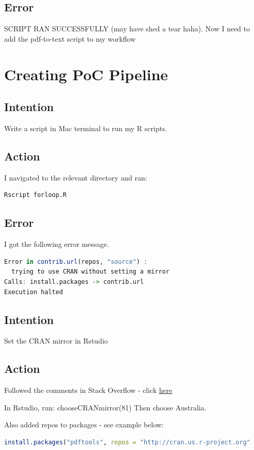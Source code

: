 \documentclass{article}
\begin{document}
\subsection{Error}
SCRIPT RAN SUCCESSFULLY (may have shed a tear haha).
Now I need to add the pdf-to-text script to my workflow

\section{Creating PoC Pipeline}
\subsection{Intention}
Write a script in Mac terminal to run my R scripts. 

\subsection{Action}
I navigated to the relevant directory and ran:
\begin{lstlisting}[language=R]
Rscript forloop.R 
\end{lstlisting}

\subsection{Error}
I got the following error message. 

\begin{lstlisting}[language=R]
Error in contrib.url(repos, "source") : 
  trying to use CRAN without setting a mirror
Calls: install.packages -> contrib.url
Execution halted
\end{lstlisting}

\subsection{Intention}
Set the CRAN mirror in Rstudio 

\subsection{Action}
Followed the comments in Stack Overflow - click \href{https://stackoverflow.com/questions/8475102/set-default-cran-mirror-permanent-in-r}{here}

In Rstudio, run: chooseCRANmirror(81) Then choose Australia.

Also added repos to packages - see example below:
\begin{lstlisting}[language=R]
install.packages("pdftools", repos = "http://cran.us.r-project.org"
\end{lstlisting}
\end{document}
